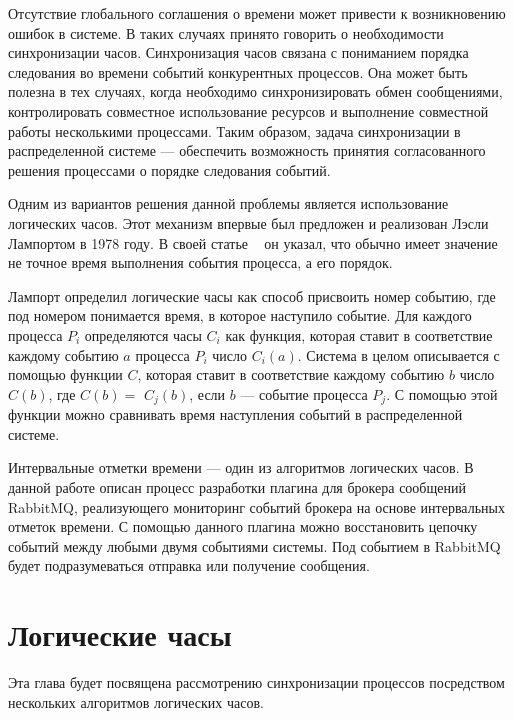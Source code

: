 





\Intro

Отсутствие глобального соглашения о времени может привести к возникновению ошибок в системе. В таких случаях принято говорить о необходимости синхронизации часов.
Синхронизация часов связана с пониманием порядка следования во времени событий конкурентных процессов. Она может быть полезна в тех случаях, когда необходимо синхронизировать обмен сообщениями, контролировать совместное использование ресурсов и выполнение совместной работы несколькими процессами. Таким образом, задача синхронизации в распределенной системе --- обеспечить возможность принятия согласованного решения процессами о порядке следования событий.

Одним из вариантов решения данной проблемы является использование логических часов. Этот механизм впервые был предложен и реализован Лэсли Лампортом в 1978 году.
В своей статье ~\cite{lamport} он указал, что обычно имеет значение не точное время выполнения события процесса, а его порядок.

Лампорт определил логические часы как способ присвоить номер событию, где под номером понимается время, в которое наступило событие. Для каждого процесса $P_i$ определяются часы $C_i$ как функция, которая ставит в соответствие каждому событию $a$ процесса $P_i$ число  $C_i(a)$. Система в целом описывается с помощью функции $C$, которая ставит в соответствие каждому событию $b$ число $C(b)$, 
где $C(b)=$ $C_j(b)$, если $b$ --- событие процесса $P_j$. С помощью этой функции можно сравнивать время наступления событий в распределенной системе.

Интервальные отметки времени --- один из алгоритмов логических часов.  
В данной работе описан процесс разработки плагина для брокера сообщений RabbitMQ, реализующего мониторинг событий брокера на основе интервальных отметок времени. С помощью данного плагина можно восстановить цепочку событий между любыми двумя событиями системы. Под событием в RabbitMQ будет подразумеваться отправка или получение сообщения. 
\newpage

\chapter{Логические часы}
\label{sec:examples}
Эта глава будет посвящена рассмотрению синхронизации процессов посредством нескольких алгоритмов логических часов.

